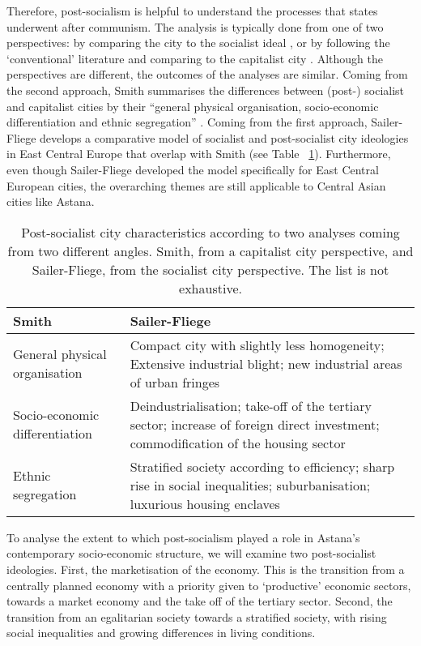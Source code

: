 \documentclass{article}
\begin{document}
Therefore, post-socialism is helpful to understand the processes that states underwent after communism. The analysis is typically done from one of two perspectives: by comparing the city to the socialist ideal \parencite{sailer1999characteristics}, or by following the `conventional' literature and comparing to the capitalist city \parencite{smith1996socialist} \parencite{haussermann1996socialist}. Although the perspectives are different, the outcomes of the analyses are similar. Coming from the second approach, Smith summarises the differences between (post-) socialist and capitalist cities by their ``general physical organisation, socio-economic differentiation and ethnic segregation'' \parencite{smith1996socialist}. Coming from the first approach, Sailer-Fliege develops a comparative model of socialist and post-socialist city ideologies in East Central Europe that overlap with Smith (see Table ~\ref{table:smith_vs_sailer}). Furthermore, even though Sailer-Fliege developed the model specifically for East Central European cities, the overarching themes are still applicable to Central Asian cities like Astana.

\hfill
\bgroup
\def\arraystretch{1.5}
\begin{table}[h!]
\centering
\begin{tabularx}{\textwidth} {
  | >{\centering\arraybackslash}X 
  | >{\centering\arraybackslash}X |}
	\hline
	\textbf{Smith} & \textbf{Sailer-Fliege} \\ 
	\hline
	General physical organisation & 
	Compact city with slightly less homogeneity; Extensive industrial blight; new industrial areas of urban fringes \\ 
	\hline
	Socio-economic differentiation & 
	Deindustrialisation; take-off of the tertiary sector; increase of foreign direct investment; commodification of the housing sector \\ 
	\hline
	Ethnic segregation & 
	Stratified society according to efficiency; sharp rise in social inequalities; suburbanisation; luxurious housing enclaves \\
	\hline
\end{tabularx}
\caption{Post-socialist city characteristics according to two analyses coming from two different angles. Smith, from a capitalist city perspective, and Sailer-Fliege, from the socialist city perspective. The list is not exhaustive.}
\label{table:smith_vs_sailer}
\end{table}
\egroup
\hfill

To analyse the extent to which post-socialism played a role in Astana's contemporary socio-economic structure, we will examine two post-socialist ideologies. 
First, the marketisation of the economy. This is the transition from a centrally planned economy with a priority given to `productive' economic sectors, towards a market economy and the take off of the tertiary sector. 
Second, the transition from an egalitarian society towards a stratified society, with rising social inequalities and growing differences in living conditions.
\end{document}

